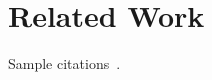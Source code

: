 
\section{Related Work}
\label{sec:related}

Sample citations~\cite{libfuzz, honggfuzz, PZKJ17, Sere17}.

